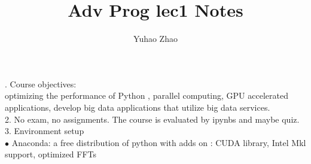 \documentclass[12pt]{article}
\begin{document}
 
 
\title{Adv Prog lec1 Notes  }%
\author{Yuhao Zhao\\ %
} %
 
 . Course objectives:\\ optimizing the performance of Python , parallel computing, GPU accelerated applications, develop big data applications that utilize big data services.	 \\

2.  No exam, no assignments. The course is evaluated by ipynbs and maybe quiz. \\

3. Environment setup\\
$\bullet$ Anaconda: a free distribution of python with adds on : CUDA library, Intel Mkl support, optimized FFTs\\












 





 


 
\end{document}
